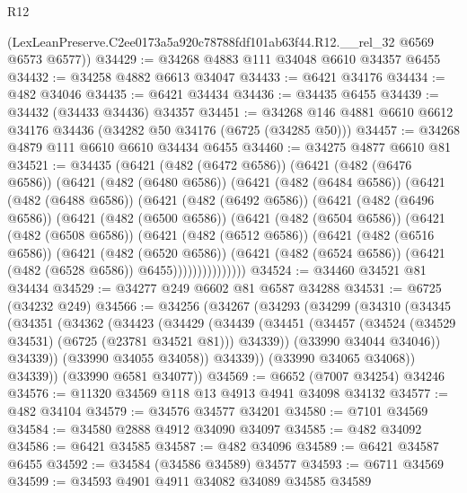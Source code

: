 \begin{lexlean}{R12}
\begin{coremodule}
      (LexLeanPreserve.C2ee0173a5a920c78788fdf101ab63f44.R12.__rel_32 @6569 @6573 @6577))
@34429 := @34268 @4883 @111 @34048 @6610 @34357 @6455
@34432 := @34258 @4882 @6613 @34047
@34433 := @6421 @34176
@34434 := @482 @34046
@34435 := @6421 @34434
@34436 := @34435 @6455
@34439 := @34432 (@34433 @34436) @34357
@34451 := @34268 @146 @4881 @6610 @6612 @34176 @34436 (@34282 @50 @34176 (@6725 (@34285 @50)))
@34457 := @34268 @4879 @111 @6610 @6610 @34434 @6455
@34460 := @34275 @4877 @6610 @81
@34521 := @34435
    (@6421
      (@482 (@6472 @6586))
      (@6421
        (@482 (@6476 @6586))
        (@6421
          (@482 (@6480 @6586))
          (@6421
            (@482 (@6484 @6586))
            (@6421
              (@482 (@6488 @6586))
              (@6421
                (@482 (@6492 @6586))
                (@6421
                  (@482 (@6496 @6586))
                  (@6421
                    (@482 (@6500 @6586))
                    (@6421
                      (@482 (@6504 @6586))
                      (@6421
                        (@482 (@6508 @6586))
                        (@6421
                          (@482 (@6512 @6586))
                          (@6421
                            (@482 (@6516 @6586))
                            (@6421
                              (@482 (@6520 @6586))
                              (@6421
                                (@482 (@6524 @6586))
                                (@6421 (@482 (@6528 @6586)) @6455)))))))))))))))
@34524 := @34460 @34521 @81 @34434
@34529 := @34277 @249 @6602 @81 @6587 @34288
@34531 := @6725 (@34232 @249)
@34566 := @34256
    (@34267
      (@34293
        (@34299
          (@34310
            (@34345
              (@34351
                (@34362
                  (@34423
                    (@34429
                      (@34439
                        (@34451
                          (@34457 (@34524 (@34529 @34531) (@6725 (@23781 @34521 @81))) @34339))
                        (@33990 @34044 @34046))
                      @34339))
                  (@33990 @34055 @34058))
                @34339))
            (@33990 @34065 @34068))
          @34339))
      (@33990 @6581 @34077))
@34569 := @6652 (@7007 @34254) @34246
@34576 := @11320 @34569 @118 @13 @4913 @4941 @34098 @34132
@34577 := @482 @34104
@34579 := @34576 @34577 @34201
@34580 := @7101 @34569
@34584 := @34580 @2888 @4912 @34090 @34097
@34585 := @482 @34092
@34586 := @6421 @34585
@34587 := @482 @34096
@34589 := @6421 @34587 @6455
@34592 := @34584 (@34586 @34589) @34577
@34593 := @6711 @34569
@34599 := @34593 @4901 @4911 @34082 @34089 @34585 @34589

\end{coremodule}
\end{lexlean}
